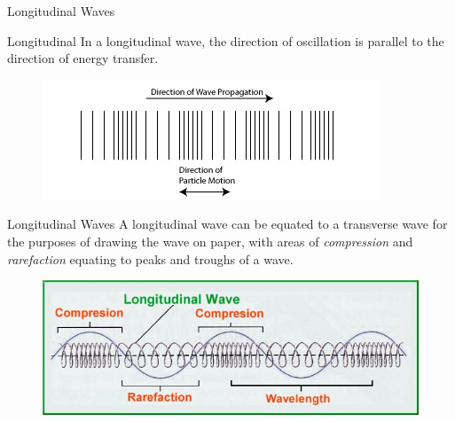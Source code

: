 \documentclass[../Main.tex]{subfiles}
\begin{document}
\begin{frame}{Longitudinal Waves}
\begin{block}{Longitudinal}
    In a longitudinal wave, the direction of oscillation is parallel to the direction of energy transfer.
    \end{block}
    
    \begin{figure}
        \centering
        \includegraphics[width=\textwidth]{Waves_Images/longitudinalwave.png}
    \end{figure}
\end{frame}

\begin{frame}{Longitudinal Waves}
    A longitudinal wave can be equated to a transverse wave for the purposes of drawing the wave on paper, with areas of \emph{compression} and \emph{rarefaction} equating to peaks and troughs of a wave. 
    
    \begin{figure}
        \centering
        \includegraphics[width=\textwidth]{Waves_Images/rarefaction.png}
    \end{figure}
\end{frame}
\end{document}
